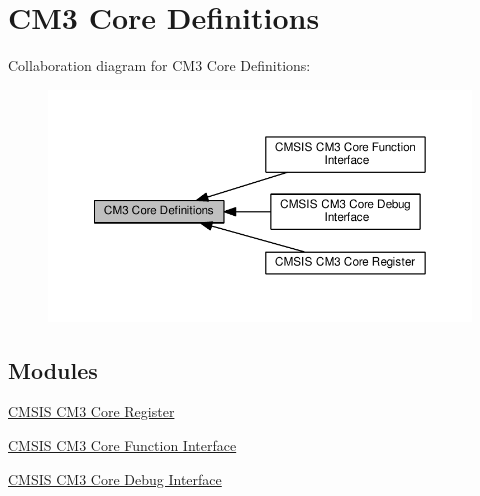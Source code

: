 \hypertarget{group__CMSIS__CM3__core__definitions}{}\section{C\+M3 Core Definitions}
\label{group__CMSIS__CM3__core__definitions}
Collaboration diagram for C\+M3 Core Definitions\+:\nopagebreak
\begin{figure}[H]
\begin{center}
\leavevmode
\includegraphics[width=350pt]{d4/dcf/group__CMSIS__CM3__core__definitions}
\end{center}
\end{figure}
\subsection*{Modules}
\begin{DoxyCompactItemize}
\item 
\hyperlink{group__CMSIS__CM3__core__register}{C\+M\+S\+I\+S C\+M3 Core Register}
\item 
\hyperlink{group__CMSIS__CM3__Core__FunctionInterface}{C\+M\+S\+I\+S C\+M3 Core Function Interface}
\item 
\hyperlink{group__CMSIS__CM3__CoreDebugInterface}{C\+M\+S\+I\+S C\+M3 Core Debug Interface}
\end{DoxyCompactItemize}
